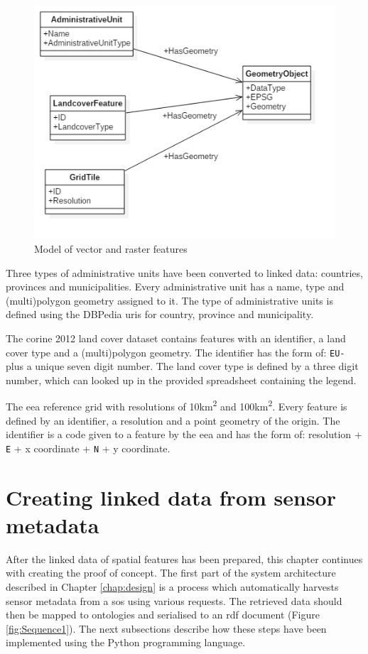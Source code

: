 \begin{figure}
	\centering
	\includegraphics[width=0.7\linewidth]{UML/staticdata2.PNG}
	\caption{Model of vector and raster features}
	\label{fig:Static}
\end{figure}

Three types of administrative units have been converted to linked data: countries, provinces and municipalities. Every administrative unit has a name, type and (multi)polygon geometry assigned to it. The type of administrative units is defined using the DBPedia \ac{uri}s for country, province and municipality. 

The \ac{corine} 2012 land cover dataset contains features with an identifier, a land cover type and a (multi)polygon geometry. The identifier has the form of: \texttt{EU-} plus a unique seven digit number. The land cover type is defined by a three digit number, which can looked up in the provided spreadsheet containing the legend.    

The \ac{eea} reference grid with resolutions of 10km\textsuperscript{2} and 100km\textsuperscript{2}. Every feature is defined by an identifier, a resolution and a point geometry of the origin. The identifier is a code given to a feature by the \ac{eea} and has the form of: resolution + \texttt{E} + x coordinate + \texttt{N} + y coordinate.  


\section{Creating linked data from sensor metadata}
\label{par:linkedSD}

After the linked data of spatial features has been prepared, this chapter continues with creating the proof of concept. The first part of the system architecture described in Chapter \ref{chap:design} is a process which automatically harvests sensor metadata from a \ac{sos} using various requests. The retrieved data should then be mapped to ontologies and serialised to an \ac{rdf} document (Figure \ref{fig:Sequence1}). The next subsections describe how these steps have been implemented using the Python programming language.


